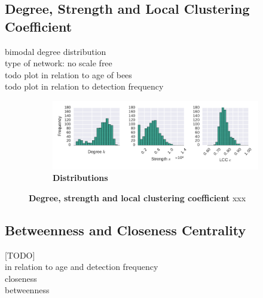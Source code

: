\subsection{Degree, Strength and Local Clustering Coefficient}

bimodal degree distribution\\
type of network: no scale free\\
todo plot in relation to age of bees\\
todo plot in relation to detection frequency\\

\begin{figure}[!htb]
	\centering
	\begin{subfigure}[b]{1.0\textwidth}
	\centering
	\includegraphics[width=1.0\textwidth]{Figures/n3-stat-degreeStrLCC}
	\caption[Distributions]{\textbf{Distributions}}
	\label{fig:n3-d-s-cc}
	\end{subfigure}
	\caption[Degree, strength and local clustering coefficient]{\textbf{Degree, strength and local clustering coefficient} xxx}
	\label{fig:n3-degreeStrLCC}
\end{figure}

\subsection{Betweenness and Closeness Centrality}
[TODO]\\
in relation to age and detection frequency\\
closeness\\
betweenness\\

